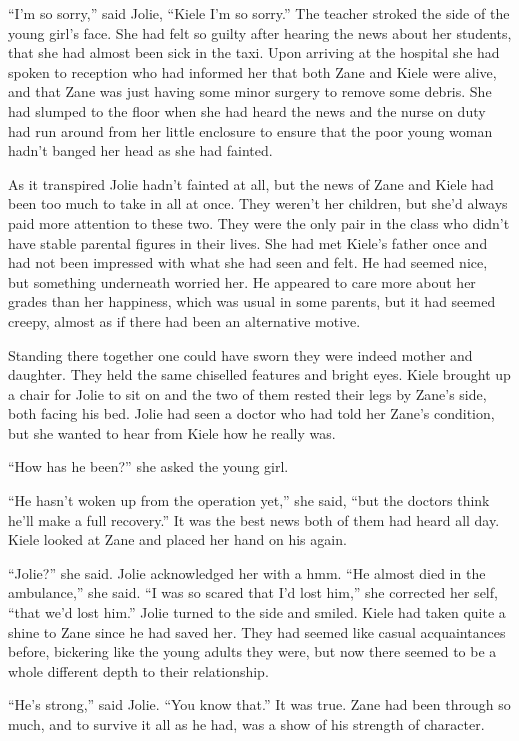 ``I'm so sorry,'' said Jolie, ``Kiele I'm so sorry.''  The teacher stroked the side of the young girl's face.  She had felt so guilty after hearing the news about her students, that she had almost been sick in the taxi.  Upon arriving at the hospital she had spoken to reception who had informed her that both Zane and Kiele were alive, and that Zane was just having some minor surgery to remove some debris.  She had slumped to the floor when she had heard the news and the nurse on duty had run around from her little enclosure to ensure that the poor young woman hadn't banged her head as she had fainted.  

As it transpired Jolie hadn't fainted at all, but the news of Zane and Kiele had been too much to take in all at once.  They weren't her children, but she'd always paid more attention to these two.  They were the only pair in the class who didn't have stable parental figures in their lives.  She had met Kiele's father once and had not been impressed with what she had seen and felt.  He had seemed nice, but something underneath worried her.  He appeared to care more about her grades than her happiness, which was usual in some parents, but it had seemed creepy, almost as if there had been an alternative motive.  

Standing there together one could have sworn they were indeed mother and daughter.  They held the same chiselled features and bright eyes.  Kiele brought up a chair for Jolie to sit on and the two of them rested their legs by Zane's side, both facing his bed.  Jolie had seen a doctor who had told her Zane's condition, but she wanted to hear from Kiele how he really was.

``How has he been?'' she asked the young girl.  

``He hasn't woken up from the operation yet,'' she said, ``but the doctors think he'll make a full recovery.''  It was the best news both of them had heard all day.  Kiele looked at Zane and placed her hand on his again.  

``Jolie?'' she said.  Jolie acknowledged her with a hmm.  ``He almost died in the ambulance,'' she said.  ``I was so scared that I'd lost him,'' she corrected her self, ``that we'd lost him.''  Jolie turned to the side and smiled.  Kiele had taken quite a shine to Zane since he had saved her.  They had seemed like casual acquaintances before, bickering like the young adults they were, but now there seemed to be a whole different depth to their relationship.

``He's strong,'' said Jolie.  ``You know that.''  It was true.  Zane had been through so much, and to survive it all as he had, was a show of his strength of character.

